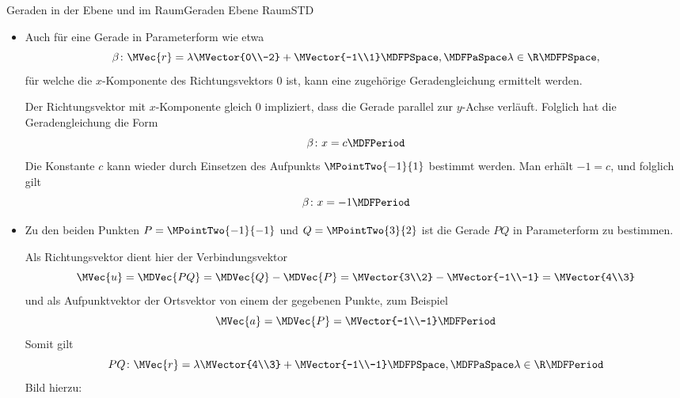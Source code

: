 \begin{MXContent}{Geraden in der Ebene und im Raum}{Geraden Ebene Raum}{STD}
\begin{MExample}
\begin{itemize}
 Der Richtungsvektor $\MVector{-3\\2}$ liefert die Steigung $m=\frac{2}{-3}=-\frac{2}{3}$. Somit hat die Geradengleichung in Normalform die Form
 \[
  \alpha\colon y=-\frac{2}{3}x+b \MDFPeriod
 \]
 Der Aufpunktvektor von $\alpha$ lautet $\MVector{1\\1}$. Somit kann zur Bestimmung des Achsenabschnitts $b$ der Aufpunkt $\MPointTwo{1}{1}$ eingesetzt werden:
 \[
  1=-\frac{2}{3}\cdot1+b\MDFPSpace\Leftrightarrow\MDFPSpace b=\frac{5}{3}\MDFPeriod
 \]
 Somit ergibt sich
 \[
  \alpha\colon y=-\frac{2}{3}x+\frac{5}{3} \MDFPeriod
 \]
 \item Auch für eine Gerade in Parameterform wie etwa
 \[
  \beta\colon \MVec{r}=\lambda\MVector{0\\-2} + \MVector{-1\\1}\MDFPSpace,\MDFPaSpace \lambda\in\R \MDFPSpace ,
 \]
 für welche die $x$-Komponente des Richtungsvektors $0$ ist, kann eine zugehörige Geradengleichung ermittelt werden.
 
 Der Richtungsvektor mit $x$-Komponente gleich $0$ impliziert, dass die Gerade parallel zur $y$-Achse verläuft. Folglich hat die Geradengleichung die Form
 \[
  \beta\colon x=c \MDFPeriod
 \]
 Die Konstante $c$ kann wieder durch Einsetzen des Aufpunkts $\MPointTwo{-1}{1}$ bestimmt werden. Man erhält $-1=c$, und folglich gilt
 \[
  \beta\colon x=-1 \MDFPeriod
 \]
 \item Zu den beiden Punkten $P=\MPointTwo{-1}{-1}$ und $Q=\MPointTwo{3}{2}$ ist die Gerade $P Q$ in Parameterform zu bestimmen. 
 
 Als Richtungsvektor dient hier der Verbindungsvektor
 \[
  \MVec{u}=\MDVec{P Q}=\MDVec{Q}-\MDVec{P}=\MVector{3\\2}-\MVector{-1\\-1}=\MVector{4\\3}
 \]
 und als Aufpunktvektor der Ortsvektor von einem der gegebenen Punkte, zum Beispiel
 \[
  \MVec{a}=\MDVec{P}=\MVector{-1\\-1}\MDFPeriod
 \]
 Somit gilt
 \[
  P Q\colon \MVec{r}=\lambda\MVector{4\\3}+\MVector{-1\\-1}\MDFPSpace,\MDFPaSpace\lambda\in\R \MDFPeriod
 \]
 Bild hierzu:
 \begin{center}
\end{center}
\end{itemize}
\end{MExample}
\end{MXContent}
